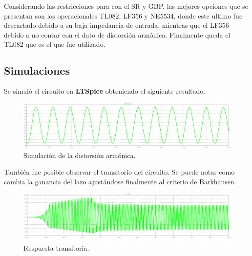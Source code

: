 Considerando las restricciones para con el SR y GBP, las mejores opciones que se presentan son los operacionales TL082, LF356 y NE5534, donde este ultimo fue descartado debido a su baja impedancia de entrada, mientras que el LF356 debido a no contar con el dato de distorsión armónica. Finalmente queda el TL082 que es el que fue utilizado.

\subsection{Simulaciones}
Se simuló el circuito en \textbf{LTSpice} obteniendo el siguiente resultado.
\begin{figure}[H]
	\centering
	\includegraphics[width=\textwidth]{Imagenes-Ej1/osc.png}
	\caption{Simulación de la distorsión armónica.}
	\label{fig:osc}
\end{figure}

También fue posible observar el transitorio del circuito. Se puede notar como cambia la ganancia del lazo ajustándose finalmente al criterio de Barkhausen.
\begin{figure}[H]
	\centering
	\includegraphics[width=\textwidth]{Imagenes-Ej1/trans.png}
	\caption{Respuesta transitoria.}
	\label{fig:trans}
\end{figure}

